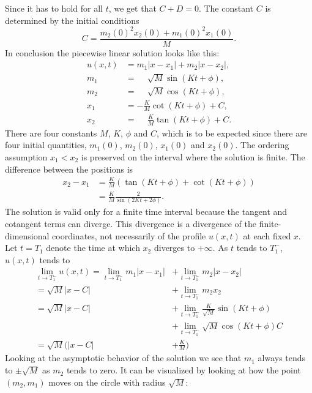 \documentclass[english,master]{liumaiex}
\theoremstyle{thesisplain}
\theoremstyle{thesisdefinition}
\numberwithin{equation}{section}
\begin{document}
%
Since it has to hold for all $t$, we get that $C + D = 0$. The constant $C$ is determined by the initial conditions
\begin{equation} \label{eq:N2CInvariant}
	C = \frac{m_2(0)^2 x_2(0) + m_1(0)^2 x_1(0)}{M}.
\end{equation}
In conclusion the piecewise linear solution looks like this:
\begin{align}
	u(x, t) &= m_1|x - x_1| + m_2|x - x_2|, \\
	m_1 &= \phantom{-}\sqrt{M} \sin(Kt + \phi), \\
	m_2 &= \phantom{-}\sqrt{M} \cos(Kt + \phi), \\
	x_1 &= -\frac{K}{M}\cot(Kt + \phi) + C, \\
	x_2 &= \phantom{-}\frac{K}{M}\tan(Kt + \phi) + C.
\end{align}
%
There are four constants $M$, $K$, $\phi$ and $C$, which is to be expected since there are four initial quantities, $m_1(0)$, $m_2(0)$, $x_1(0)$ and $x_2(0)$. The ordering assumption $x_1 < x_2$ is preserved on the interval where the solution is finite. The difference between the positions is
\begin{equation}
\begin{aligned}
	x_2 - x_1 
	&= \frac{K}{M}(\tan(Kt + \phi) + \cot(Kt + \phi)) \\
	&= \frac{K}{M}\frac{2}{\sin(2Kt + 2\phi)}.
\end{aligned}
\end{equation}
The solution is valid only for a finite time interval because the tangent and cotangent terms can diverge. This divergence is a divergence of the finite-dimensional coordinates, not necessarily of the profile $u(x,t)$ at each fixed $x$. Let $t=T_1$ denote the time at which $x_2$ diverges to $+\infty$. As $t$ tends to $T_1^-$, $u(x,t)$ tends to
\begin{equation}
\begin{aligned}
	\lim_{t \to T_1^-} u(x, t)
	= \lim_{t \to T_1^-} m_1|x - x_1| &+ \lim_{t \to T_1^-} m_2|x - x_2| \\
	= \sqrt{M}|x - C| &+ \lim_{t \to T_1^-} m_2 x_2 \\
	= \sqrt{M}|x - C| &+ \lim_{t \to T_1^-} \frac{K}{\sqrt{M}} \sin(Kt + \phi) \\
	&+ \lim_{t \to T_1^-} \sqrt{M} \cos(Kt + \phi) C\\
	= \sqrt{M}\Big(|x - C| &+ \frac{K}{M}\Big)
\end{aligned}
\end{equation}
%
Looking at the asymptotic behavior of the solution we see that $m_1$ always tends to $\pm \sqrt{M}$ as $m_2$ tends to zero. It can be visualized by looking at how the point $(m_2, m_1)$ moves on the circle with radius $\sqrt{M}$:
\end{document}
